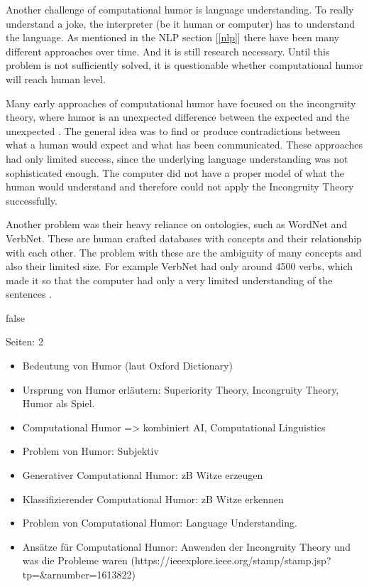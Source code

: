 \documentclass[draft,final,oneside]{vutinfth} %
\begin{document}
Another challenge of computational humor is language understanding. To really understand a joke, the interpreter (be it human or computer) has to understand the language. As mentioned in the NLP section [\ref{nlp}] there have been many different approaches over time. And it is still research necessary. Until this problem is not sufficiently solved, it is questionable whether computational humor will reach human level.

Many early approaches of computational humor have focused on the incongruity theory, where humor is an unexpected difference between the expected and the unexpected \cite{comphumorsummary}. The general idea was to find or produce contradictions between what a human would expect and what has been communicated. These approaches had only limited success, since the underlying language understanding was not sophisticated enough. The computer did not have a proper model of what the human would understand and therefore could not apply the Incongruity Theory successfully.

Another problem was their heavy reliance on ontologies, such as WordNet and VerbNet. These are human crafted databases with concepts and their relationship with each other. The problem with these are the ambiguity of many concepts and also their limited size. For example VerbNet had only around 4500 verbs, which made it so that the computer had only a very limited understanding of the sentences \cite{comphumorsummary}	.


\if false

Seiten: 2
\begin{itemize}
\item Bedeutung von Humor (laut Oxford Dictionary)
\item Ursprung von Humor erläutern: Superiority Theory, Incongruity Theory, Humor als Spiel.
\item Computational Humor => kombiniert AI, Computational Linguistics
\item Problem von Humor: Subjektiv
\item Generativer Computational Humor: zB Witze erzeugen
\item Klassifizierender Computational Humor: zB Witze erkennen
\item Problem von Computational Humor: Language Understanding.
\item Ansätze für Computational Humor: Anwenden der Incongruity Theory und was die Probleme waren (https://ieeexplore.ieee.org/stamp/stamp.jsp?tp=\&arnumber=1613822)
\end{itemize}
\fi
\end{document}
